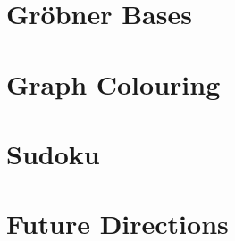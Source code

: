 \documentclass[11pt]{article}
\theoremstyle{definition}
\begin{document}
    

    \section{Gr\"obner Bases}

    



    \section{Graph Colouring}
    
    

        
        
    \section{Sudoku}

    

    \section{Future Directions}
    
    

    \pagebreak

    
    

    \pagebreak

    \appendix
    
    
\end{document}
